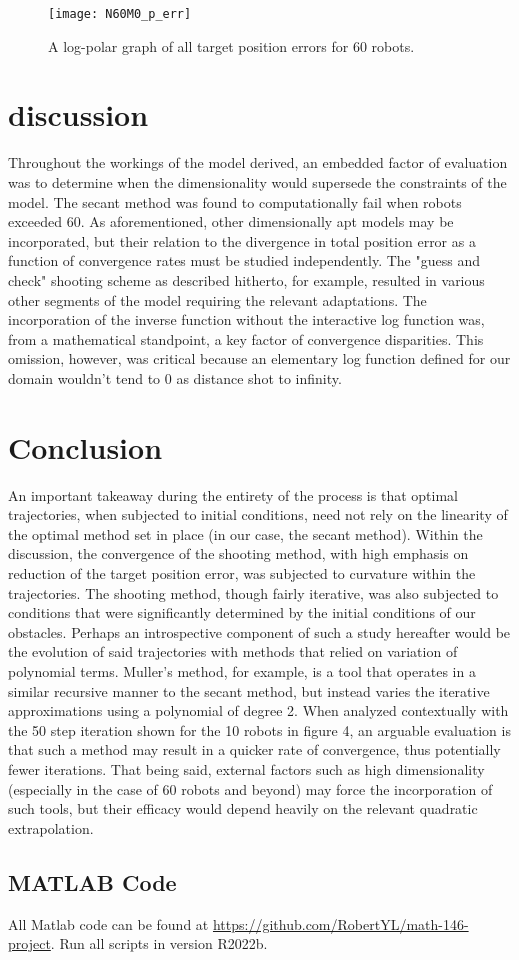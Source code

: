 \documentclass[11pt]{article}
\begin{document}
\begin{figure}
	\centering
	\texttt{[image: N60M0\_p\_err]}
	\caption{A log-polar graph of all target position errors for 60 robots.}
	\label{fig:n60m0-p-err}
\end{figure}

\section{discussion}
Throughout the workings of the model derived, an embedded factor of evaluation was to determine when the dimensionality would supersede the constraints of the model. The secant method was found to computationally fail when robots exceeded 60. As aforementioned, other dimensionally apt models may be incorporated, but their relation to the divergence in total position error as a function of convergence rates must be studied independently. The "guess and check" shooting scheme as described hitherto, for example, resulted in various other segments of the model requiring the relevant adaptations. The incorporation of the inverse function without the interactive log function was, from a mathematical standpoint, a key factor of convergence disparities. This omission, however, was critical because an elementary log function defined for our domain wouldn't tend to 0 as distance shot to infinity. 


\section{Conclusion}
An important takeaway during the entirety of the process is that optimal trajectories, when subjected to initial conditions, need not rely on the linearity of the optimal method set in place (in our case, the secant method). Within the discussion, the convergence of the shooting method, with high emphasis on reduction of the target position error, was subjected to curvature within the trajectories. The shooting method, though fairly iterative, was also subjected to conditions that were significantly determined by the initial conditions of our obstacles. Perhaps an introspective component of such a study hereafter would be the evolution of said trajectories with methods that relied on variation of polynomial terms. Muller's method, for example, is a tool that operates in a similar recursive manner to the secant method, but instead varies the iterative approximations using a polynomial of degree 2. When analyzed contextually with the 50 step iteration shown for the 10 robots in figure 4, an arguable evaluation is that such a method may result in a quicker rate of convergence, thus potentially fewer iterations. That being said, external factors such as high dimensionality (especially in the case of 60 robots and beyond) may force the incorporation of such tools, but their efficacy would depend heavily on the relevant quadratic extrapolation. 

\clearpage

\begin{appendices}

\section{MATLAB Code}

All Matlab code can be found at \url{https://github.com/RobertYL/math-146-project}. Run all scripts in version R2022b.

\end{appendices}
\end{document}
